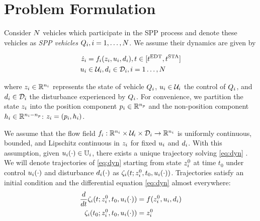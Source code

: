 \section{Problem Formulation \label{sec:formulation}}

Consider $N$ vehicles which participate in the SPP process and denote these vehicles as \textit{SPP vehicles} $Q_i, i = 1, \ldots, N$. We assume their dynamics are given by

\begin{equation}
\label{eq:dyn}
\begin{aligned}
\dot\state_i &= \fdyn_i(\state_i, \ctrl_i, \dstb_i), t \in [\edt, \sta] \\
\ctrl_i &\in \cset_i, \dstb_i \in \dset_i, i = 1 \ldots, \N
\end{aligned}
\end{equation}

\noindent where $z_i \in \mathbb{R}^{n_i}$ represents the state of vehicle $Q_i$, $u_i \in \mathcal{U}_i$ the control of $Q_i$, and $d_i \in \mathcal{D}_i$ the disturbance experienced by $Q_i$. For convenience, we partition the state $z_i$ into the position component $p_i \in \mathbb{R}^{n_p}$ and the non-position component $h_i \in \mathbb{R}^{n_i - n_p}$: $z_i = (p_i, h_i)$.

We assume that the flow field $f_i: \mathbb{R}^{n_i}\times\mathcal{U}_i\times\mathcal{D}_i \rightarrow \mathbb{R}^{n_i}$ is uniformly continuous, bounded, and Lipschitz continuous in $z_i$ for fixed $u_i$ and $d_i$. With this assumption, given $u_i(\cdot) \in \mathbb{U}_i$, there exists a unique trajectory solving \eqref{eq:dyn} \cite{EarlA.Coddington1955}. We will denote trajectories of \eqref{eq:dyn} starting from state $z^0_i$ at time $t_0$ under control $u_i(\cdot)$ and disturbance $d_i(\cdot)$ as $\zeta_i(t; z^0_i, t_0, u_i(\cdot))$. Trajectories satisfy an initial condition and the differential equation \eqref{eq:dyn} almost everywhere:
\begin{equation}
\begin{aligned}
\frac{d}{dt}\zeta_i(t; z^0_i, t_0, u_i(\cdot)) &= f(z^0_i, u_i, d_i) \\
\zeta_i(t_0; z^0_i, t_0, u_i(\cdot)) &= z^0_i
\end{aligned}
\end{equation}

